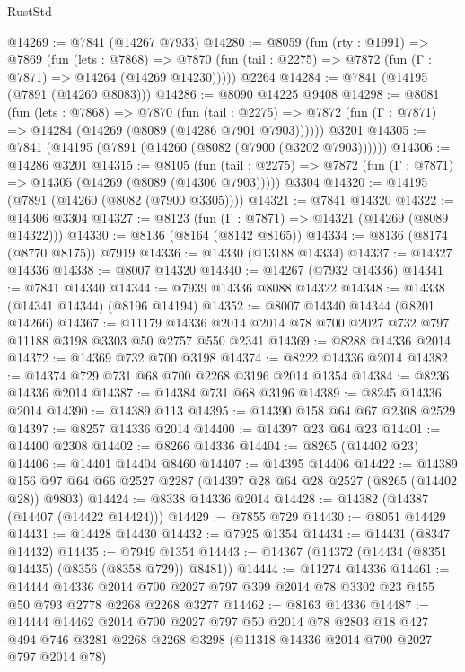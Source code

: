 \begin{lexlean}{RustStd}
\begin{coremodule}
{\begin{coremodule}
{{{{{{{{{{{{{{{{{{{{{{{{{{{{{{{{{{{{{{{{{{{{{{{{{{{{{{@14269 := @7841 (@14267 @7933)
@14280 := @8059
    (fun (rty : @1991) =>
    @7869
      (fun (lets : @7868) =>
      @7870 (fun (tail : @2275) => @7872 (fun (Γ : @7871) => @14264 (@14269 @14230)))))
    @2264
@14284 := @7841 (@14195 (@7891 (@14260 @8083)))
@14286 := @8090 @14225 @9408
@14298 := @8081
    (fun (lets : @7868) =>
    @7870
      (fun (tail : @2275) =>
      @7872 (fun (Γ : @7871) => @14284 (@14269 (@8089 (@14286 @7901 @7903))))))
    @3201
@14305 := @7841 (@14195 (@7891 (@14260 (@8082 (@7900 (@3202 @7903))))))
@14306 := @14286 @3201
@14315 := @8105
    (fun (tail : @2275) => @7872 (fun (Γ : @7871) => @14305 (@14269 (@8089 (@14306 @7903)))))
    @3304
@14320 := @14195 (@7891 (@14260 (@8082 (@7900 @3305))))
@14321 := @7841 @14320
@14322 := @14306 @3304
@14327 := @8123 (fun (Γ : @7871) => @14321 (@14269 (@8089 @14322)))
@14330 := @8136 (@8164 (@8142 @8165))
@14334 := @8136 (@8174 (@8770 @8175)) @7919
@14336 := @14330 (@13188 @14334)
@14337 := @14327 @14336
@14338 := @8007 @14320
@14340 := @14267 (@7932 @14336)
@14341 := @7841 @14340
@14344 := @7939 @14336 @8088 @14322
@14348 := @14338 (@14341 @14344) (@8196 @14194)
@14352 := @8007 @14340 @14344 (@8201 @14266)
@14367 := @11179 @14336 @2014 @2014 @78 @700 @2027 @732 @797 @11188 @3198 @3303 @50 @2757 @550 @2341
@14369 := @8288 @14336 @2014
@14372 := @14369 @732 @700 @3198
@14374 := @8222 @14336 @2014
@14382 := @14374 @729 @731 @68 @700 @2268 @3196 @2014 @1354
@14384 := @8236 @14336 @2014
@14387 := @14384 @731 @68 @3196
@14389 := @8245 @14336 @2014
@14390 := @14389 @113
@14395 := @14390 @158 @64 @67 @2308 @2529
@14397 := @8257 @14336 @2014
@14400 := @14397 @23 @64 @23
@14401 := @14400 @2308
@14402 := @8266 @14336
@14404 := @8265 (@14402 @23)
@14406 := @14401 @14404 @8460
@14407 := @14395 @14406
@14422 := @14389 @156 @97 @64 @66 @2527 @2287 (@14397 @28 @64 @28 @2527 (@8265 (@14402 @28)) @9803)
@14424 := @8338 @14336 @2014
@14428 := @14382 (@14387 (@14407 (@14422 @14424)))
@14429 := @7855 @729
@14430 := @8051 @14429
@14431 := @14428 @14430
@14432 := @7925 @1354
@14434 := @14431 (@8347 @14432)
@14435 := @7949 @1354
@14443 := @14367 (@14372 (@14434 (@8351 @14435) (@8356 (@8358 @729)) @8481))
@14444 := @11274 @14336
@14461 := @14444
    @14336
    @2014
    @700
    @2027
    @797
    @399
    @2014
    @78
    @3302
    @23
    @455
    @50
    @793
    @2778
    @2268
    @2268
    @3277
@14462 := @8163 @14336
@14487 := @14444
    @14462
    @2014
    @700
    @2027
    @797
    @50
    @2014
    @78
    @2803
    @18
    @427
    @494
    @746
    @3281
    @2268
    @2268
    @3298
    (@11318 @14336 @2014 @700 @2027 @797 @2014 @78)
}}}}}}}}}}}}}}}}}}}}}}}}}}}}}}}}}}}}}}}}}}}}}}}}}}}}}}
\end{coremodule}}
\end{coremodule}
\end{lexlean}
